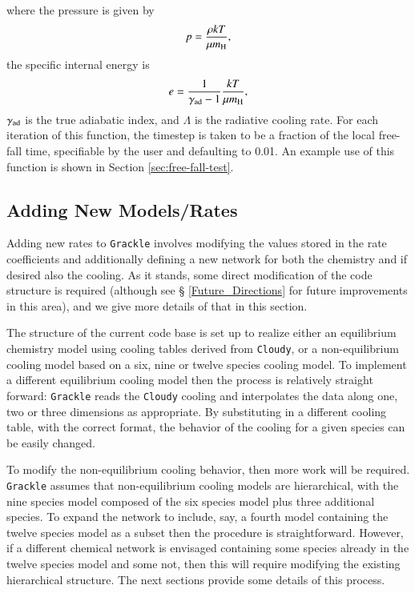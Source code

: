 where the pressure is given by
\begin{equation}
p = \frac{\rho k T}{\mu m_{\rm H}},
\end{equation}
the specific internal energy is
\begin{equation}
e = \frac{1}{\gamma_{\rm ad} -1} \frac{k T}{\mu m_{\rm H}},
\label{eq:defen}
\end{equation}
$\gamma_{\rm ad}$ is the true adiabatic index, and $\Lambda$ is the
radiative cooling rate.  For each iteration of this function, the
timestep is taken to be a fraction of the local free-fall time,
specifiable by the user and defaulting to 0.01.  An example use of
this function is shown in Section \ref{sec:free-fall-test}.


\subsection{Adding New Models/Rates}

Adding new rates to \texttt{Grackle} involves modifying the values stored in
the rate coefficients and additionally defining a new network for both
the chemistry and if desired also the cooling. As it stands, some
direct modification of the code structure is required (although see \S
\ref{Future_Directions} for future improvements in this area), and we
give more details of that in this section.

The structure of the current code base is set up to realize either an
equilibrium chemistry model using cooling tables derived from \texttt{Cloudy},
or a non-equilibrium cooling model based on a six, nine or twelve
species cooling model.  To implement a different equilibrium cooling
model then the process is relatively straight forward: \texttt{Grackle} reads
the \texttt{Cloudy} cooling and interpolates the data along one, two or three
dimensions as appropriate. By substituting in a different cooling
table, with the correct format, the behavior of the cooling for a
given species can be easily changed.

To modify the non-equilibrium cooling behavior, then more work will be
required. \texttt{Grackle} assumes that non-equilibrium cooling models are
hierarchical, with the nine species model composed of the six species
model plus three additional species.  To expand the network to
include, say, a fourth model containing the twelve species model as a
subset then the procedure is straightforward. However, if a different
chemical network is envisaged containing some species already in the
twelve species model and some not, then this will require modifying
the existing hierarchical structure.  The next sections provide some
details of this process.

